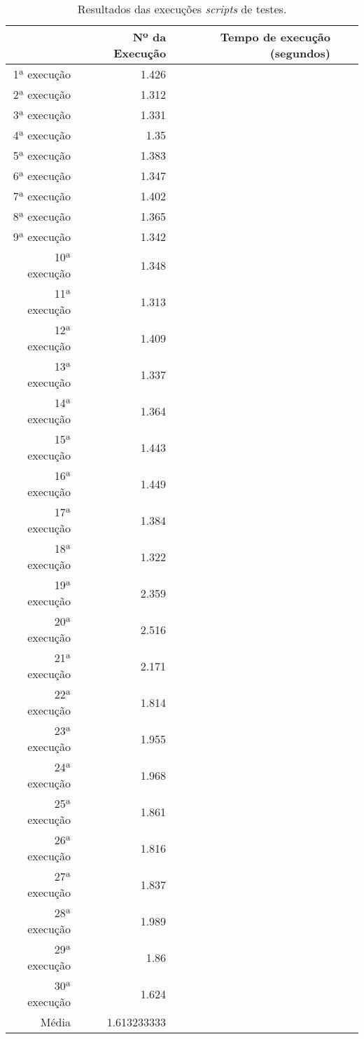 \begin{table}[!htb]
    \vspace{0.5cm}
    \centering
    \begin{tabularx}{\textwidth}{rrrrr}
        \toprule
    & Nº da Execução & Tempo de execução (segundos) \\
        \midrule
             1ª execução	&	1.426	\\
             2ª execução	&	1.312	\\
             3ª execução	&	1.331	\\
             4ª execução	&	1.35	\\
             5ª execução	&	1.383	\\
             6ª execução	&	1.347	\\
             7ª execução	&	1.402	\\
             8ª execução	&	1.365	\\
             9ª execução	&	1.342	\\
            10ª execução &	1.348	\\
            11ª execução &	1.313	\\
            12ª execução &	1.409	\\
            13ª execução &	1.337	\\
            14ª execução &	1.364	\\
            15ª execução &	1.443	\\
            16ª execução &	1.449	\\
            17ª execução &	1.384	\\
            18ª execução &	1.322	\\
            19ª execução &	2.359	\\
            20ª execução &	2.516	\\
            21ª execução &	2.171	\\
            22ª execução &	1.814	\\
            23ª execução &	1.955	\\
            24ª execução &	1.968	\\
            25ª execução &	1.861	\\
            26ª execução &	1.816	\\
            27ª execução &	1.837	\\
            28ª execução &	1.989	\\
            29ª execução &	1.86	\\
            30ª execução &	1.624	\\
        \bottomrule
         Média & 1.613233333
    \end{tabularx}
	\caption[Resultados das execuções scripts de testes]{Resultados das execuções \emph{scripts} de testes.\label{tab:execucaoDosTestes}}
\end{table}